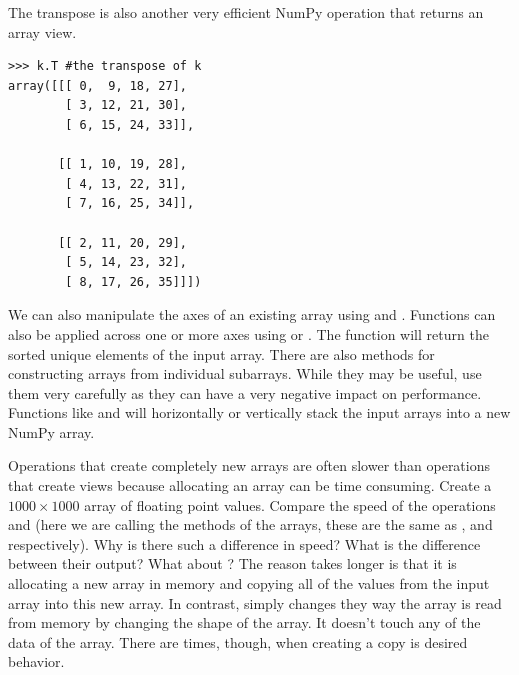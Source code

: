 The transpose is also another very efficient NumPy operation that returns an array view.   
\begin{lstlisting}
>>> k.T #the transpose of k
array([[[ 0,  9, 18, 27],
        [ 3, 12, 21, 30],
        [ 6, 15, 24, 33]],

       [[ 1, 10, 19, 28],
        [ 4, 13, 22, 31],
        [ 7, 16, 25, 34]],

       [[ 2, 11, 20, 29],
        [ 5, 14, 23, 32],
        [ 8, 17, 26, 35]]])
\end{lstlisting}

We can also manipulate the axes of an existing array using  and .
Functions can also be applied across one or more axes using  or .  
The function  will return the sorted unique elements of the input array.
There are also methods for constructing arrays from individual subarrays.
While they may be useful, use them very carefully as they can have a very negative impact on performance.
Functions like  and  will horizontally or vertically stack the input arrays into a new NumPy array.

\begin{problem}
Operations that create completely new arrays are often slower than operations that create views because allocating an array can be time consuming.
Create a $1000 \times 1000$ array  of floating point values.
Compare the speed of the operations  and  (here we are calling the methods of the arrays, these are the same as , and  respectively).
Why is there such a difference in speed?
What is the difference between their output?
What about ?
The reason  takes longer is that it is allocating a new array in memory and copying all of the values from the input array into this new array.  In contrast,  simply changes they way the array is read from memory by changing the shape of the array.  It doesn't touch any of the data of the array.  There are times, though, when creating a copy is desired behavior.
\end{problem}


